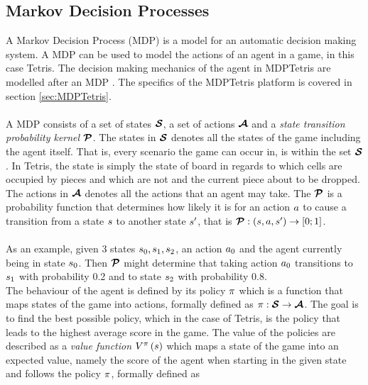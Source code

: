 \subsection{Markov Decision Processes \label{MDP}}

A Markov Decision Process (MDP) is a model for an automatic 
decision making system. A MDP can be used to model the actions 
of an agent in a game, in this case Tetris. 
The decision making mechanics of the agent in MDPTetris are modelled
after an MDP \citep{mdptetris}. The specifics of the 
MDPTetris platform is covered in section \ref{sec:MDPTetris}.\\
\\
A MDP consists of a set of states $\boldsymbol{\mathcal{S}}$,
a set of actions $\boldsymbol{\mathcal{A}}$ and a 
\textit{state transition probability kernel} $\boldsymbol{\mathcal{P}}$.
The states in $\boldsymbol{\mathcal{S}}$ denotes all the states of the game
including the agent itself. That is, every scenario
the game can occur in, is within the set $\boldsymbol{\mathcal{S}}$. 
In Tetris, the state is simply the
state of board in regards to which cells are
occupied by pieces and which are not and the 
current piece about to be dropped.
The actions in $\boldsymbol{\mathcal{A}}$
denotes all the actions that an agent may take. The $\boldsymbol{\mathcal{P}}$ is
a probability function that determines how likely it is for an action $a$
to cause a transition from a state $s$ to another state $s^\prime$, that is 
$\boldsymbol{\mathcal{P}} : \left( s, a, s^\prime \right) \rightarrow [0;1]$.\\\\
As an example, given 3 states 
$s_0, s_1, s_2$, an action $a_0$ and the 
agent currently being in state $s_0$. Then $\boldsymbol{\mathcal{P}}$
might determine that taking action $a_0$ transitions
to $s_1$ with probability 0.2 and to state $s_2$
with probability 0.8. \\
The behaviour of the agent is defined by its policy $\pi$
which is a function that maps states of the game into actions, formally
defined as $\pi : \boldsymbol{\mathcal{S}} \rightarrow \boldsymbol{\mathcal{A}}$.
The goal is to find the best possible policy, which in the case
of Tetris, is the policy that leads to the highest average score
in the game. The value of the policies are described as a 
\textit{value function} 
$V^{\pi}\left( s  \right)$ 
which maps a state
of the game into an expected value, namely the score of the 
agent when starting in the given state and follows
the policy $\pi$, formally defined as
